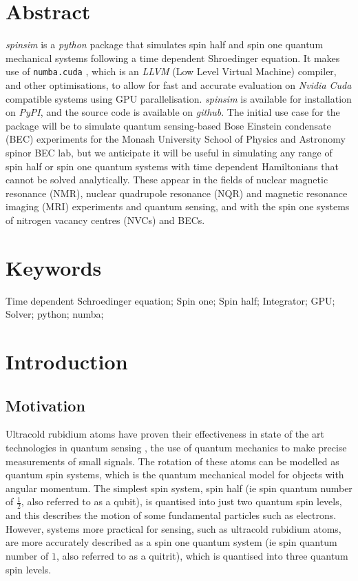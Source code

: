 \documentclass{jors}
\begin{document}
\section{Abstract}
	\emph{spinsim} is a \emph{python} package that simulates spin half and spin one quantum mechanical systems following a time dependent Shroedinger equation.
	It makes use of \texttt{numba.cuda} \cite{lam_numba_2015}, which is an \emph{LLVM} (Low Level Virtual Machine) \cite{lattner_llvm_2004} compiler, and other optimisations, to allow for fast and accurate evaluation on \emph{Nvidia Cuda} \cite{nickolls_scalable_2008} compatible systems using GPU parallelisation.
	\emph{spinsim} is available for installation on \emph{PyPI}, and the source code is available on \emph{github}.
	The initial use case for the package will be to simulate quantum sensing-based Bose Einstein condensate (BEC) experiments for the Monash University School of Physics and Astronomy spinor BEC lab, but we anticipate it will be useful in simulating any range of spin half or spin one quantum systems with time dependent Hamiltonians that cannot be solved analytically.
	These appear in the fields of nuclear magnetic resonance (NMR), nuclear quadrupole resonance (NQR) and magnetic resonance imaging (MRI) experiments and quantum sensing, and with the spin one systems of nitrogen vacancy centres (NVCs) and BECs.

\section{Keywords}
Time dependent Schroedinger equation; Spin one; Spin half; Integrator; GPU; Solver; python; numba;

\section{Introduction}
\subsection{Motivation}
	Ultracold rubidium atoms have proven their effectiveness in state of the art technologies in quantum sensing \cite{degen_quantum_2017}, the use of quantum mechanics to make precise measurements of small signals.
	The rotation of these atoms can be modelled as quantum spin systems, which is the quantum mechanical model for objects with angular momentum.
	The simplest spin system, spin half (ie spin quantum number of \(\frac12\), also referred to as a qubit), is quantised into just two quantum spin levels, and this describes the motion of some fundamental particles such as electrons.
	However, systems more practical for sensing, such as ultracold rubidium atoms, are more accurately described as a spin one quantum system (ie spin quantum number of \(1\), also referred to as a quitrit), which is quantised into three quantum spin levels.
	
\end{document}
